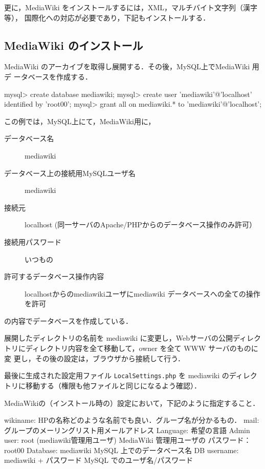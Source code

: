 更に，MediaWiki をインストールするには，XML，マルチバイト文字列（漢字等），
国際化への対応が必要であり，下記もインストールする．


\subsection{MediaWiki のインストール}

MediaWiki のアーカイブを取得し展開する．その後，MySQL上でMediaWiki 用デ
ータベースを作成する．
\begin{cli}
mysql> create database mediawiki;
mysql> create user 'mediawiki'@'localhost' identified by 'root00';
mysql> grant all on mediawiki.* to 'mediawiki'@'localhost';
\end{cli}
この例では，MySQL上にて，MediaWiki用に，
\begin{description}
 \item[データベース名] mediawiki
 \item[データベース上の接続用MySQLユーザ名] mediawiki
 \item[接続元] localhost (同一サーバのApache/PHPからのデータベース操作のみ許可）
 \item[接続用パスワード] いつもの
 \item[許可するデータベース操作内容] localhostからのmediawikiユーザにmediawiki データベースへの全ての操作を許可
\end{description}
の内容でデータベースを作成している．

展開したディレクトリの名前を mediawiki に変更し，Webサーバの公開ディレク
トリにディレクトリ内容を全て移動して，owner を全て WWW サーバのものに変
更し，その後の設定は，ブラウザから接続して行う．

最後に生成された設定用ファイル \texttt{LocalSettings.php} を mediawiki 
のディレクトリに移動する（権限も他ファイルと同じになるよう確認）．

MediaWikiの（インストール時の）設定において，下記のように指定すること．

\begin{cli}
wikiname: HPの名称どのような名前でも良い．グループ名が分かるもの．
mail: グループのメーリングリスト用メールアドレス
Language: 希望の言語
Admin user: root (mediawiki管理用ユーザ)
        MediaWiki 管理用ユーザの
        パスワード：root00
Database: mediawiki
        MySQL 上でのデータベース名
DB username: mediawiki
        + パスワード
        MySQL でのユーザ名/パスワード
\end{cli}

